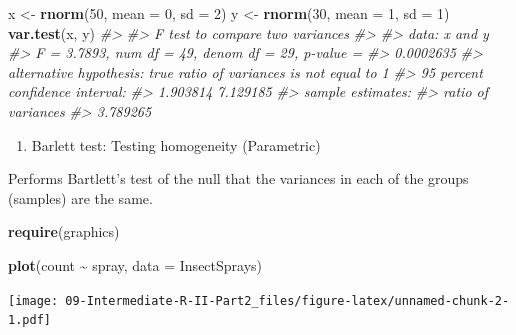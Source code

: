 \documentclass[
]{book}
\newenvironment{Shaded}{\begin{snugshade}}{\end{snugshade}}
\newcommand{\AttributeTok}[1]{\textcolor[rgb]{0.13,0.29,0.53}{#1}}
\newcommand{\CommentTok}[1]{\textcolor[rgb]{0.56,0.35,0.01}{\textit{#1}}}
\newcommand{\DecValTok}[1]{\textcolor[rgb]{0.00,0.00,0.81}{#1}}
\newcommand{\FunctionTok}[1]{\textcolor[rgb]{0.13,0.29,0.53}{\textbf{#1}}}
\newcommand{\NormalTok}[1]{#1}
\newcommand{\OtherTok}[1]{\textcolor[rgb]{0.56,0.35,0.01}{#1}}
\newcommand{\SpecialCharTok}[1]{\textcolor[rgb]{0.81,0.36,0.00}{\textbf{#1}}}
\providecommand{\tightlist}{%
  \setlength{\itemsep}{0pt}\setlength{\parskip}{0pt}}
\begin{document}
\begin{Shaded}
\begin{Highlighting}[]
\NormalTok{x }\OtherTok{\textless{}{-}} \FunctionTok{rnorm}\NormalTok{(}\DecValTok{50}\NormalTok{, }\AttributeTok{mean =} \DecValTok{0}\NormalTok{, }\AttributeTok{sd =} \DecValTok{2}\NormalTok{)}
\NormalTok{y }\OtherTok{\textless{}{-}} \FunctionTok{rnorm}\NormalTok{(}\DecValTok{30}\NormalTok{, }\AttributeTok{mean =} \DecValTok{1}\NormalTok{, }\AttributeTok{sd =} \DecValTok{1}\NormalTok{)}
\FunctionTok{var.test}\NormalTok{(x, y)}
\CommentTok{\#\textgreater{} }
\CommentTok{\#\textgreater{}  F test to compare two variances}
\CommentTok{\#\textgreater{} }
\CommentTok{\#\textgreater{} data:  x and y}
\CommentTok{\#\textgreater{} F = 3.7893, num df = 49, denom df = 29, p{-}value =}
\CommentTok{\#\textgreater{} 0.0002635}
\CommentTok{\#\textgreater{} alternative hypothesis: true ratio of variances is not equal to 1}
\CommentTok{\#\textgreater{} 95 percent confidence interval:}
\CommentTok{\#\textgreater{}  1.903814 7.129185}
\CommentTok{\#\textgreater{} sample estimates:}
\CommentTok{\#\textgreater{} ratio of variances }
\CommentTok{\#\textgreater{}           3.789265}
\end{Highlighting}
\end{Shaded}

\begin{enumerate}
\def\labelenumi{\alph{enumi}.}
\setcounter{enumi}{1}
\tightlist
\item
  Barlett test: Testing homogeneity (Parametric)
\end{enumerate}

Performs Bartlett's test of the null that the variances in each of the groups (samples) are the same.

\begin{Shaded}
\begin{Highlighting}[]
\FunctionTok{require}\NormalTok{(graphics)}

\FunctionTok{plot}\NormalTok{(count }\SpecialCharTok{\textasciitilde{}}\NormalTok{ spray, }\AttributeTok{data =}\NormalTok{ InsectSprays)}
\end{Highlighting}
\end{Shaded}

\texttt{[image: 09-Intermediate-R-II-Part2\_files/figure-latex/unnamed-chunk-2-1.pdf]}

\begin{Shaded}
\end{Shaded}
\end{document}
